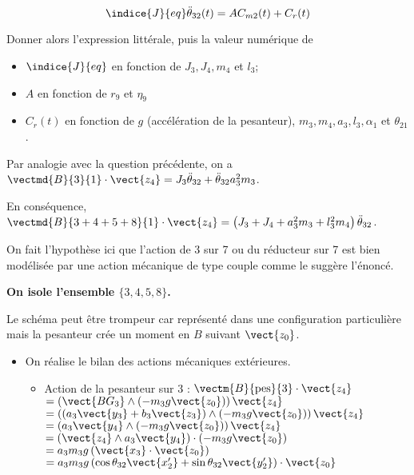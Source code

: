 $$
\indice{J}{eq} \ddot{\theta}_{32}(t)=A C_{m 2}(t)+C_{r}(t)
$$

Donner alors l'expression littérale, puis la valeur numérique de

\begin{itemize}
  \item $\indice{J}{eq}$ en fonction de $J_{3}, J_{4}, m_{4}$ et $l_{3}$;
  \item $A$ en fonction de $r_{9}$ et $\eta_{9}$
  \item $C_{r}(t)$ en fonction de $g$ (accélération de la pesanteur), $m_{3}, m_{4}, a_{3}, l_{3}, \alpha_{1}$ et $\theta_{21}$.
\end{itemize}

\ifprof
\begin{corrige}
Par analogie avec la question précédente, on a $\vectmd{B}{3}{1}\cdot\vect{z_4}= J_3\ddot{\theta}_{32}+\ddot{\theta}_{32}a_3^2 m_3$.

En conséquence,  $\vectmd{B}{3+4+5+8}{1}\cdot\vect{z_4} = \left(J_3+J_4+a_3^2 m_3  +l_3^2 m_4\right) \ddot{\theta}_{32}$.

\begin{rem}
On fait l'hypothèse ici que l'action de 3 sur 7 ou du réducteur sur 7 est bien modélisée par une action mécanique de type couple comme le suggère l'énoncé.
\end{rem}



\textbf{On isole l'ensemble $\{3,4,5,8\}$.}

\begin{rem}
Le schéma peut être trompeur car représenté dans une configuration particulière mais la pesanteur crée un moment en $B$ suivant $\vect{z_0}$.
\end{rem}

\begin{itemize}
\item On réalise le bilan des actions mécaniques extérieures. 
\begin{itemize}
\item Action de la pesanteur sur 3 : 
$\vectm{B}{\text{pes}}{3}\cdot \vect{z_4} $ $ =\left(\vect{BG_3}\wedge \left(-m_3g \vect{z_0}\right) \right)\vect{z_4}$ 
$ =\left(\left( a_3\vect{y_3} + b_3\vect{z_3}  \right)\wedge \left(-m_3g \vect{z_0}\right)\right)\vect{z_4}$
$ =\left( a_3\vect{y_4} \wedge \left(-m_3g \vect{z_0}\right)\right)\vect{z_4}$
$ =\left( \vect{z_4} \wedge a_3\vect{y_4}\right)\cdot  \left(-m_3g \vect{z_0}\right)$
$ = a_3 m_3g \left( \vect{x_3}\cdot \vect{z_0} \right)$
$ = a_3 m_3g \left(  \cos\theta_{32} \vect{x_2'} +\sin\theta_{32} \vect{y_2'} \right)\cdot \vect{z_0} $


\end{itemize}
\end{itemize}
\end{corrige}
